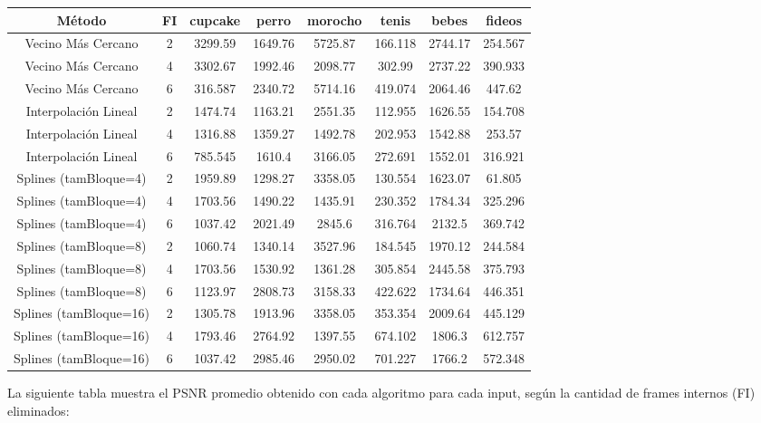 \bigskip
{}
\begin{tabular}{| c | c | c | c | c | c | c | c |} 
\hline
\textbf{Método} & \textbf{FI} & \textbf{cupcake} & \textbf{perro} & \textbf{morocho} & \textbf{tenis} & \textbf{bebes} & \textbf{fideos} \\ 
\hline
Vecino Más Cercano & 2 & 3299.59 & 1649.76 & 5725.87 & 166.118 & 2744.17 & 254.567  \\
\hline
Vecino Más Cercano & 4 & 3302.67 & 1992.46 & 2098.77 & 302.99 & 2737.22 & 390.933 \\
\hline
Vecino Más Cercano & 6 & 316.587 & 2340.72 & 5714.16 & 419.074 & 2064.46 & 447.62 \\
\hline
Interpolación Lineal & 2 & 1474.74 & 1163.21 & 2551.35 & 112.955 & 1626.55 & 154.708 \\
\hline
Interpolación Lineal & 4 & 1316.88 & 1359.27 & 1492.78 & 202.953  & 1542.88 & 253.57 \\
\hline
Interpolación Lineal & 6 & 785.545 & 1610.4 & 3166.05 & 272.691 & 1552.01 & 316.921 \\
\hline
Splines (tamBloque=4) & 2 & 1959.89 & 1298.27 & 3358.05 & 130.554 & 1623.07 & 61.805 \\
\hline
Splines (tamBloque=4) & 4 & 1703.56 & 1490.22 & 1435.91 & 230.352 & 1784.34 & 325.296 \\
\hline
Splines (tamBloque=4) & 6 & 1037.42 & 2021.49 & 2845.6 & 316.764 & 2132.5 & 369.742 \\
\hline
Splines (tamBloque=8) & 2 & 1060.74 & 1340.14 & 3527.96 & 184.545 & 1970.12 & 244.584 \\
\hline
Splines (tamBloque=8) & 4 & 1703.56 & 1530.92 & 1361.28 & 305.854 & 2445.58 & 375.793 \\
\hline
Splines (tamBloque=8) & 6 & 1123.97 & 2808.73 &3158.33 & 422.622 & 1734.64 & 446.351 \\
\hline
Splines (tamBloque=16) & 2 & 1305.78 & 1913.96 & 3358.05 & 353.354 & 2009.64 & 445.129 \\
\hline
Splines (tamBloque=16) & 4 & 1793.46 & 2764.92 & 1397.55 & 674.102 & 1806.3 & 612.757 \\
\hline
Splines (tamBloque=16) & 6 & 1037.42 & 2985.46 & 2950.02 & 701.227 & 1766.2 & 572.348 \\
\hline
\end{tabular}

\bigskip

\newpage

La siguiente tabla muestra el PSNR promedio obtenido con cada algoritmo para cada input, según la cantidad de frames internos (FI) eliminados:

